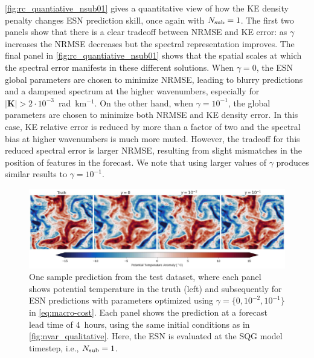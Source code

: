 \cref{fig:rc_quantiative_nsub01} gives a quantitative view of how the KE density
penalty changes ESN prediction skill, once again with $N_\text{sub}=1$.
The first two panels show that there is a clear tradeoff between NRMSE and KE error:
as $\gamma$ increases the NRMSE decreases but the spectral representation improves.
The final panel in \cref{fig:rc_quantiative_nsub01}
shows that the spatial scales at which the spectral error manifests in these
different solutions.
When $\gamma=0$, the ESN global parameters are chosen to minimize NRMSE, leading
to blurry predictions and a dampened spectrum at the higher wavenumbers,
especially for $|\mathbf{K}| > 2\cdot10^{-3}$~rad~km$^{-1}$.
On the other hand, when $\gamma = 10^{-1}$, the global parameters are chosen to
minimize both NRMSE and KE density error.
In this case, KE relative error is reduced by more than a factor of two and the
spectral bias at higher wavenumbers is much more muted.
However, the tradeoff for this reduced spectral error is larger NRMSE, resulting
from slight mismatches in the position of features in the forecast.
We note that using larger values of $\gamma$ produces similar results to
$\gamma=10^{-1}$.


\begin{figure}
    \centering
    \includegraphics[width=\textwidth]{../figures/rc_qualitative_gamma.jpg}
    \caption{
        One sample prediction from the test dataset, where each panel shows
        potential temperature in the truth (left) and subsequently for
        ESN predictions with parameters optimized using
        $\gamma=\{0, 10^{-2}, 10^{-1}\}$ in \cref{eq:macro-cost}.
        Each panel shows the prediction at a forecast lead time of 4~hours,
        using the same initial conditions as in \cref{fig:nvar_qualitative}.
        Here, the ESN is evaluated at the SQG model timestep, i.e., $N_\text{sub}=1$.
    }
    \label{fig:rc_qualitative_nsub01}
\end{figure}

